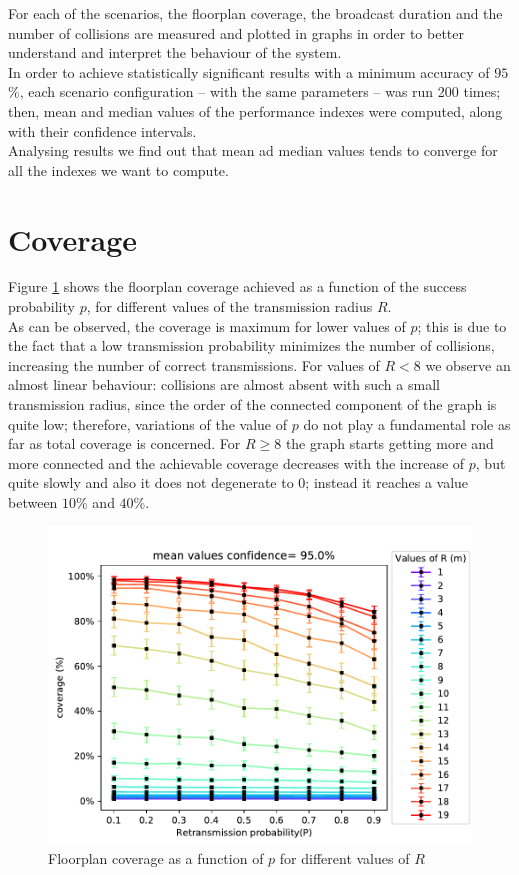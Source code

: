 For each of the scenarios, the floorplan coverage, the
broadcast duration and the number of collisions are measured and plotted in graphs in order to 
better understand and interpret the behaviour of the system.\\
In order to achieve statistically significant results with a minimum accuracy of
$95$\%, each scenario configuration -- with the same parameters -- was run 200 times; then, mean and median values of the performance
indexes were computed, along with their confidence intervals. \\
Analysing results we find out that mean ad median values tends to converge for all the indexes we want to compute.
\section{Coverage}\label{ssec:coverage}
Figure \ref{fig:coveragePR} shows the floorplan coverage achieved as a
function of the success probability $p$, for different values of
the transmission radius $R$. \\
As can be observed, the coverage is maximum
for lower values of $p$; this is due to the fact that a low transmission
probability minimizes the number of collisions, increasing the number of correct
transmissions. For values of $R < 8$ we observe an almost linear behaviour:
collisions are almost absent with such a small transmission radius, since the order of the connected component of the graph is quite low; therefore,
variations of the value of $p$ do not play a fundamental role as far as total coverage is
concerned. For $R \geq 8$ the graph starts getting more and more connected and the achievable coverage
decreases with the increase of $p$, but quite slowly and also it does not
degenerate to $0$; instead it reaches a value between $10$\% and $40$\%.
\begin{figure}[H]
    \begin{center}
        \includegraphics[scale=.7]{img/big_coverage_p_mean_95.0.pdf}
    \end{center}
    \vspace*{-0.5cm}
    \caption{Floorplan coverage as a function of $p$ for different values of $R$}
    \label{fig:coveragePR}
\end{figure}
